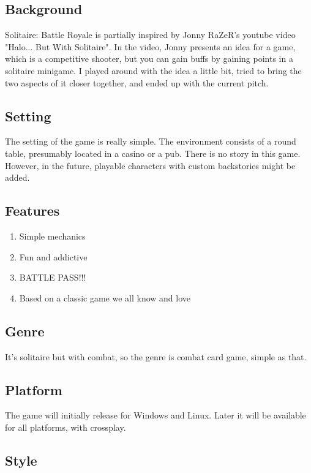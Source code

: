 \documentclass[a4paper,10pt,english]{article}
\begin{document}
\subsection*{Background}

Solitaire: Battle Royale is partially inspired by Jonny RaZeR's youtube video "Halo... But With Solitaire". In the video, Jonny presents an idea for a game, which is a competitive shooter, but you can gain buffs by gaining points in a solitaire minigame. I played around with the idea a little bit, tried to bring the two aspects of it closer together, and ended up with the current pitch.

\subsection*{Setting}

The setting of the game is really simple. The environment consists of a round table, presumably located in a casino or a pub. There is no story in this game. However, in the future, playable characters with custom backstories might be added.

\subsection*{Features}

\begin{enumerate}
    \item Simple mechanics
    \item Fun and addictive
    \item BATTLE PASS!!!
    \item Based on a classic game we all know and love
\end{enumerate}

\subsection*{Genre}

It's solitaire but with combat, so the genre is combat card game, simple as that.  

\subsection*{Platform}

The game will initially release for Windows and Linux. Later it will be available for all platforms, with crossplay.

\subsection*{Style}
\end{document}
